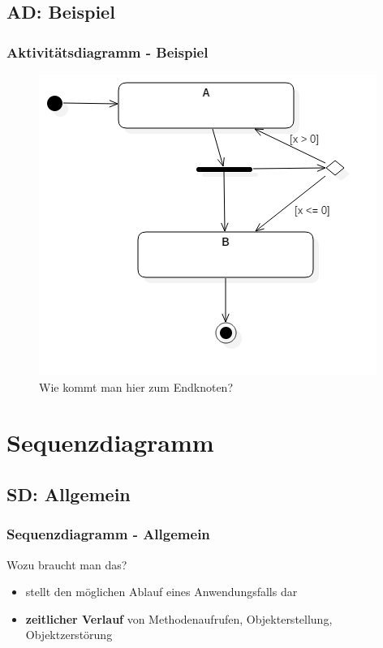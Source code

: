 \documentclass[18pt]{beamer}
\begin{document}
	\subsection{AD: Beispiel}
	\begin{frame}
		\frametitle{Aktivitätsdiagramm - Beispiel}
		\begin{figure}
			\centering
			\caption{Wie kommt man hier zum Endknoten?}
			\includegraphics[scale=0.4]{./pics/tut2/act_ex.png}
		\end{figure}
	\end{frame}

\section{Sequenzdiagramm}
	\subsection{SD: Allgemein}
	\begin{frame}
		\frametitle{Sequenzdiagramm - Allgemein}
		\begin{block}{Wozu braucht man das?}
			\pause
			\begin{itemize}
				\item stellt den möglichen Ablauf eines Anwendungsfalls dar
				\item \textbf{zeitlicher Verlauf} von Methodenaufrufen, Objekterstellung, Objektzerstörung
			\end{itemize}
		\end{block}
	\end{frame}
\end{document}
